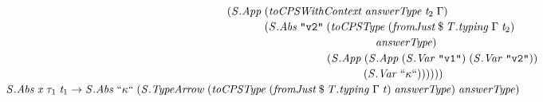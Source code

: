 \documentclass[10pt]{article}
\newcommand{\Conid}[1]{\mathit{#1}}
\newcommand{\Varid}[1]{\mathit{#1}}
\begin{document}
\begin{hscode}
${\hskip1.00em\relax\hskip1.00em\relax\phantom{\Conid{\Conid{S}.App}\;\Varid{t}_{1}\;\Varid{t}_{2}\to \Conid{\Conid{S}.Abs}\;\text{``}\kappa\text{``}\;\mbox{}}\phantom{(\Conid{\Conid{S}.App}\;\mbox{}}\phantom{(\Conid{\Conid{S}.Abs}\;\text{\tt \char34 v1\char34}\;\mbox{}}(\Conid{\Conid{S}.App}\;(\Varid{toCPSWithContext}\;\Varid{answerType}\;\Varid{t}_{2}\;\Gamma)\;}$\\
${\hskip1.00em\relax\hskip1.00em\relax\phantom{\Conid{\Conid{S}.App}\;\Varid{t}_{1}\;\Varid{t}_{2}\to \Conid{\Conid{S}.Abs}\;\text{``}\kappa\text{``}\;\mbox{}}\phantom{(\Conid{\Conid{S}.App}\;\mbox{}}\phantom{(\Conid{\Conid{S}.Abs}\;\text{\tt \char34 v1\char34}\;\mbox{}}\phantom{(\Conid{\Conid{S}.App}\;\mbox{}}(\Conid{\Conid{S}.Abs}\;\text{\tt \char34 v2\char34}\;(\Varid{toCPSType}\;(\Varid{fromJust}\mathbin{\$}\Varid{\Conid{T}.typing}\;\Gamma\;\Varid{t}_{2})\;}$\\
${\hskip1.00em\relax\hskip1.00em\relax\phantom{\Conid{\Conid{S}.App}\;\Varid{t}_{1}\;\Varid{t}_{2}\to \Conid{\Conid{S}.Abs}\;\text{``}\kappa\text{``}\;\mbox{}}\phantom{(\Conid{\Conid{S}.App}\;\mbox{}}\phantom{(\Conid{\Conid{S}.Abs}\;\text{\tt \char34 v1\char34}\;\mbox{}}\phantom{(\Conid{\Conid{S}.App}\;\mbox{}}\hskip10.00em\relax\Varid{answerType})\;}$\\
${\hskip1.00em\relax\hskip1.00em\relax\phantom{\Conid{\Conid{S}.App}\;\Varid{t}_{1}\;\Varid{t}_{2}\to \Conid{\Conid{S}.Abs}\;\text{``}\kappa\text{``}\;\mbox{}}\phantom{(\Conid{\Conid{S}.App}\;\mbox{}}\phantom{(\Conid{\Conid{S}.Abs}\;\text{\tt \char34 v1\char34}\;\mbox{}}\phantom{(\Conid{\Conid{S}.App}\;\mbox{}}\phantom{(\Conid{\Conid{S}.Abs}\;\text{\tt \char34 v2\char34}\;\mbox{}}(\Conid{\Conid{S}.App}\;(\Conid{\Conid{S}.App}\;(\Conid{\Conid{S}.Var}\;\text{\tt \char34 v1\char34})\;(\Conid{\Conid{S}.Var}\;\text{\tt \char34 v2\char34}))\;}$\\
${\hskip1.00em\relax\hskip1.00em\relax\phantom{\Conid{\Conid{S}.App}\;\Varid{t}_{1}\;\Varid{t}_{2}\to \Conid{\Conid{S}.Abs}\;\text{``}\kappa\text{``}\;\mbox{}}\phantom{(\Conid{\Conid{S}.App}\;\mbox{}}\phantom{(\Conid{\Conid{S}.Abs}\;\text{\tt \char34 v1\char34}\;\mbox{}}\phantom{(\Conid{\Conid{S}.App}\;\mbox{}}\phantom{(\Conid{\Conid{S}.Abs}\;\text{\tt \char34 v2\char34}\;\mbox{}}\phantom{(\Conid{\Conid{S}.App}\;\mbox{}}(\Conid{\Conid{S}.Var}\;\text{``}\kappa\text{``}))))))}$\\
${\hskip1.00em\relax\hskip1.00em\relax\Conid{\Conid{S}.Abs}\;\Varid{x}\;\tau_{1}\;\Varid{t}_{1}\to \Conid{\Conid{S}.Abs}\;\text{``}\kappa\text{``}\;(\Conid{\Conid{S}.TypeArrow}\;(\Varid{toCPSType}\;(\Varid{fromJust}\mathbin{\$}\Varid{\Conid{T}.typing}\;\Gamma\;\Varid{t})\;\Varid{answerType})\;\Varid{answerType})\;}$\\

\end{hscode}
\end{document}
